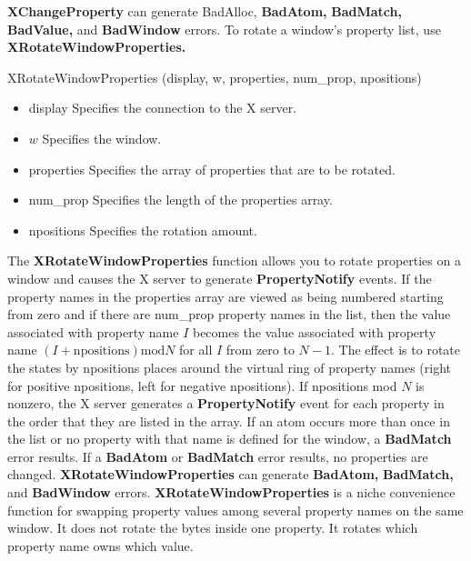 \documentclass{report}
\begin{document}
\begin{itemize}
        \bigbreak \noindent 
        \textbf{XChangeProperty} can generate BadAlloc, \textbf{BadAtom,} \textbf{BadMatch,} \textbf{BadValue,} and \textbf{BadWindow} errors.
        \bigbreak \noindent 
        To rotate a window’s property list, use \textbf{XRotateWindowProperties.}
        \bigbreak \noindent 
        \begin{cppcode}
            XRotateWindowProperties (display, w, properties, num_prop, npositions)
        \end{cppcode}
        \begin{itemize}
            \item display Specifies the connection to the X server.
            \item $w$ Specifies the window.
            \item properties Specifies the array of properties that are to be rotated.
            \item num\_prop Specifies the length of the properties array.
            \item npositions Specifies the rotation amount.
        \end{itemize}
        The \textbf{XRotateWindowProperties} function allows you to rotate properties on a window and causes the X server to generate \textbf{PropertyNotify} events. If the property names in the properties array are viewed as being numbered starting from zero and if there are num\_prop property names in the list, then the value associated with property name $I$ becomes the value associated with property name $(I + \text{npositions}) \text{mod} N$ for all $I$ from zero to $N - 1$. The effect is to rotate the states by npositions places around the virtual ring of property names (right for positive npositions, left for negative npositions). If npositions mod $N$ is nonzero, the X server generates a \textbf{PropertyNotify} event for each property in the order that they are listed in the array. If an atom occurs more than once in the list or no property with that name is defined for the window, a \textbf{BadMatch} error results. If a \textbf{BadAtom} or \textbf{BadMatch} error results, no properties are changed.
        \bigbreak \noindent 
        \textbf{XRotateWindowProperties} can generate \textbf{BadAtom,} \textbf{BadMatch,} and \textbf{BadWindow} errors.
        \bigbreak \noindent 
        \textbf{XRotateWindowProperties} is a niche convenience function for swapping property values among several property names on the same window.
        \bigbreak \noindent 
        It does not rotate the bytes inside one property. It rotates which property name owns which value.

\end{itemize}
\end{document}
